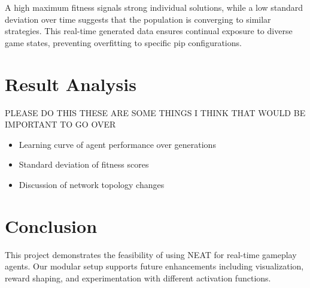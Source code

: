 \documentclass[sigconf]{acmart}
\begin{document}
A high maximum fitness signals strong individual solutions, while a low standard deviation over time suggests that the population is converging to similar strategies. This real-time generated data ensures continual exposure to diverse game states, preventing overfitting to specific pip configurations.



\section{Result Analysis}
PLEASE DO THIS THESE ARE SOME THINGS I THINK THAT WOULD BE IMPORTANT TO GO OVER
\begin{itemize}
  \item Learning curve of agent performance over generations
  \item Standard deviation of fitness scores
  \item Discussion of network topology changes
\end{itemize}

\section{Conclusion}
This project demonstrates the feasibility of using NEAT for real-time gameplay agents. Our modular setup supports future enhancements including visualization, reward shaping, and experimentation with different activation functions.
\end{document}
